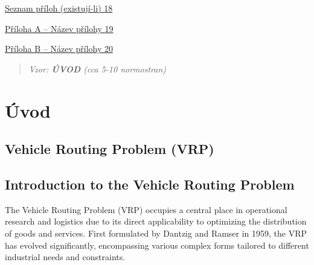\documentclass[
]{article}
\begin{document}
\protect\hyperlink{seznam-pux159uxedloh-existujuxed-li}{Seznam příloh
  (existují-li)
  \protect\hyperlink{seznam-pux159uxedloh-existujuxed-li}{18}}

\protect\hyperlink{pux159uxedloha-a-nuxe1zev-pux159uxedlohy}{Příloha A
  -- Název přílohy
  \protect\hyperlink{pux159uxedloha-a-nuxe1zev-pux159uxedlohy}{19}}

\protect\hyperlink{pux159uxedloha-b-nuxe1zev-pux159uxedlohy}{Příloha B
  -- Název přílohy
  \protect\hyperlink{pux159uxedloha-b-nuxe1zev-pux159uxedlohy}{20}}

\newpage
\begin{quote}
  \emph{Vzor: \textbf{ÚVOD} (cca 5-10 normostran)}
\end{quote}

\hypertarget{section-1}{%
  \subsection{}\label{section-1}}

\hypertarget{uxfavod}{%
  \section{Úvod}\label{uxfavod}}

\newpage




\hypertarget{vehicle-routing-problem}{%
  \subsection{Vehicle Routing Problem (VRP)}\label{vehicle-routing-problem}}


\hypertarget{introduction-to-the-vehicle-routing-problem}{%
  \subsection{Introduction to the Vehicle Routing Problem}\label{introduction-to-the-vehicle-routing-problem}}

The Vehicle Routing Problem (VRP) occupies a central place in operational research and logistics due to its direct applicability to optimizing the distribution of goods and services. First formulated by Dantzig and Ramser in 1959, the VRP has evolved significantly, encompassing various complex forms tailored to different industrial needs and constraints.
\end{document}

